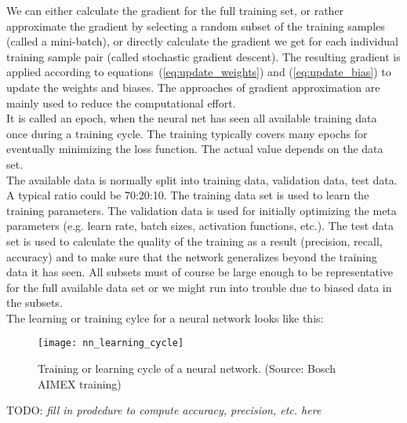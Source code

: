 We can either calculate the gradient for the full training set, or rather approximate the
gradient by selecting a random subset of the training samples (called a mini-batch), or
directly calculate the gradient we get for each individual training sample pair (called
stochastic gradient descent). The resulting gradient is applied according to
equations~(\ref{eq:update_weights}) and (\ref{eq:update_bias}) to update the weights and
biases. The approaches of gradient approximation are mainly used to reduce the
computational effort. \\

It is called an epoch, when the neural net has seen all available training data once
during a training cycle. The training typically covers many epochs for eventually
minimizing the loss function. The actual value depends on the data set. \\

The available data is normally split into training data, validation data, test data. A
typical ratio could be 70:20:10. The training data set is used to learn the training
parameters. The validation data is used for initially optimizing the meta parameters (e.g.
learn rate, batch sizes, activation functions, etc.). The test data set is used to
calculate the quality of the training as a result (precision, recall, accuracy) and to
make sure that the network generalizes beyond the training data it has seen. All
subsets must of course be large enough to be representative for the full available data
set or we might run into trouble due to biased data in the subsets. \\

The learning or training cylce for a neural network looks like this:
\begin{figure}[h] \centering \texttt{[image: nn\_learning\_cycle]}
    \caption{Training or learning cycle of a neural network.
    (Source: Bosch AIMEX training)}
    \label{fig:training_cycle}
\end{figure}

TODO: \emph{fill in prodedure to compute accuracy, precision, etc. here}

\newpage
